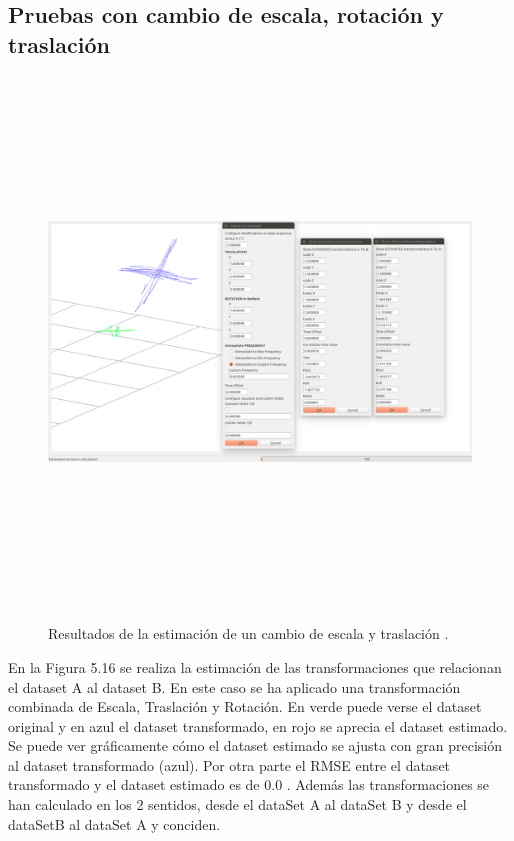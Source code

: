 \subsection{Pruebas con cambio de escala, rotación y traslación}
\begin{figure}[H]
\begin{center}
\label{fig:opciones de View}\includegraphics[height=14.0cm,width=18.0cm]{img/cap6/Escala_Trasla_Rota_abba.png}
\hspace{0.5cm}

\end{center}

\caption{Resultados de la estimación de un cambio de escala y traslación .}
\end{figure}

En la Figura 5.16 se realiza la estimación de las transformaciones que relacionan el dataset A al dataset B. En este caso se ha aplicado una transformación combinada de Escala, Traslación y Rotación. En verde puede verse el dataset original y en azul el dataset transformado, en rojo se aprecia el dataset estimado.
Se puede ver gráficamente cómo el dataset estimado se ajusta con gran precisión al dataset transformado (azul).
Por otra parte el RMSE entre el dataset transformado y el dataset estimado es de 0.0
. Además las transformaciones se han calculado en los 2 sentidos, desde el dataSet A  al dataSet B y desde el dataSetB al dataSet A y conciden.

